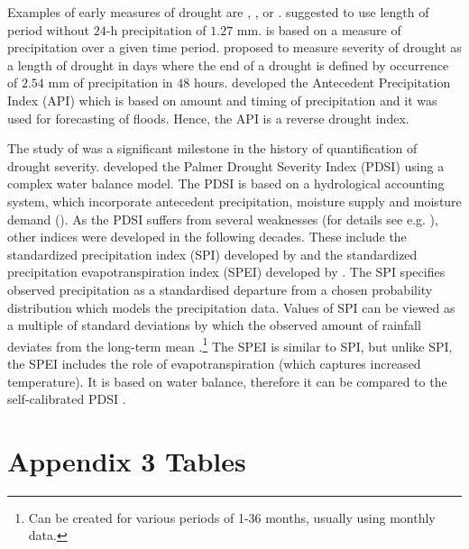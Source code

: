 \documentclass[a4paper,12pt]{article}
\begin{document}
 
 
Examples of early measures of drought are \cite{wilhite1985}, \cite{munger1916}, \cite{blumenstock1942} or \cite{mcquigg1954}. \cite{munger1916} suggested to use length of period without $24$-h precipitation of $1.27$ mm. \cite{wilhite1985} is based on a measure of precipitation over a given time period. \cite{blumenstock1942} proposed to measure severity of drought as a length of drought in days where the end of a drought is defined by occurrence of $2.54$ mm of precipitation in $48$ hours. \cite{mcquigg1954} developed the Antecedent Precipitation Index (API) which is based on amount and timing of precipitation and it was used for forecasting of floods. Hence, the API is a reverse drought index.

The study of \cite{palmer1965} was a significant milestone in the history of quantification of drought severity. \cite{palmer1965} developed the Palmer Drought Severity Index (PDSI) using a complex water balance model. The PDSI is based on a hydrological accounting system, which incorporate antecedent precipitation, moisture supply and moisture demand (\citealp{Heim2002,palmer1965}). As the PDSI suffers from several weaknesses (for details see e.g. \citealt{Heim2002}), other indices were developed in the following decades. These include the standardized precipitation index (SPI) developed by \cite{SPI} and the standardized precipitation evapotranspiration index (SPEI) developed by \cite{SPEI}. The SPI specifies observed precipitation as a standardised departure from a chosen probability distribution which models the precipitation data. Values of SPI can be viewed as a multiple of standard deviations by which the observed amount of rainfall deviates from the long-term mean \citep{SPIonline}.\footnote{Can be created for various periods of 1-36 months, usually using monthly data.} The SPEI is similar to SPI, but unlike SPI, the SPEI includes the role of evapotranspiration (which captures increased temperature). It is based on water balance, therefore it can be compared to the self-calibrated PDSI \citep{SPEI}. 


\section{Appendix 3 Tables}
\end{document}
